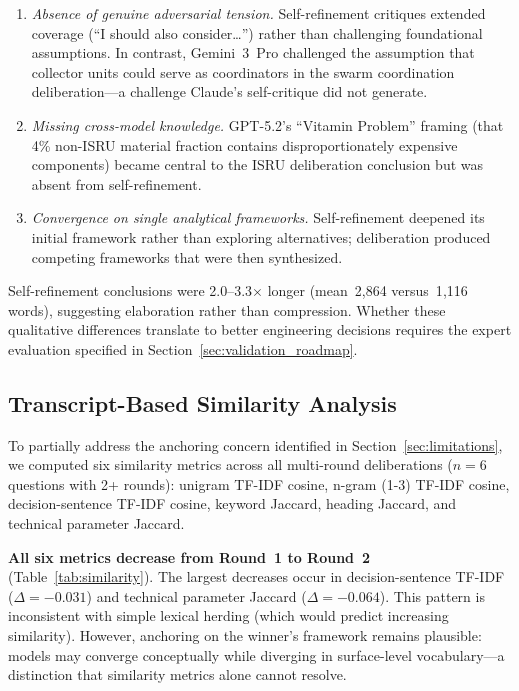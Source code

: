 \documentclass[11pt,a4paper]{article}
\begin{document}
\begin{enumerate}[nosep]
    \item \emph{Absence of genuine adversarial tension.} Self-refinement critiques extended coverage (``I should also consider\ldots'') rather than challenging foundational assumptions. In contrast, Gemini~3~Pro challenged the assumption that collector units could serve as coordinators in the swarm coordination deliberation---a challenge Claude's self-critique did not generate.
    \item \emph{Missing cross-model knowledge.} GPT-5.2's ``Vitamin Problem'' framing (that 4\% non-ISRU material fraction contains disproportionately expensive components) became central to the ISRU deliberation conclusion but was absent from self-refinement.
    \item \emph{Convergence on single analytical frameworks.} Self-refinement deepened its initial framework rather than exploring alternatives; deliberation produced competing frameworks that were then synthesized.
\end{enumerate}

Self-refinement conclusions were 2.0--3.3$\times$ longer (mean~2{,}864 versus~1{,}116 words), suggesting elaboration rather than compression. Whether these qualitative differences translate to better engineering decisions requires the expert evaluation specified in Section~\ref{sec:validation_roadmap}.

\subsection{Transcript-Based Similarity Analysis}
\label{sec:similarity}

To partially address the anchoring concern identified in Section~\ref{sec:limitations}, we computed six similarity metrics across all multi-round deliberations ($n = 6$ questions with 2+ rounds): unigram TF-IDF cosine, n-gram (1-3) TF-IDF cosine, decision-sentence TF-IDF cosine, keyword Jaccard, heading Jaccard, and technical parameter Jaccard.

\textbf{All six metrics decrease from Round~1 to Round~2} (Table~\ref{tab:similarity}). The largest decreases occur in decision-sentence TF-IDF ($\Delta = -0.031$) and technical parameter Jaccard ($\Delta = -0.064$). This pattern is inconsistent with simple lexical herding (which would predict increasing similarity). However, anchoring on the winner's framework remains plausible: models may converge conceptually while diverging in surface-level vocabulary---a distinction that similarity metrics alone cannot resolve.
\end{document}
